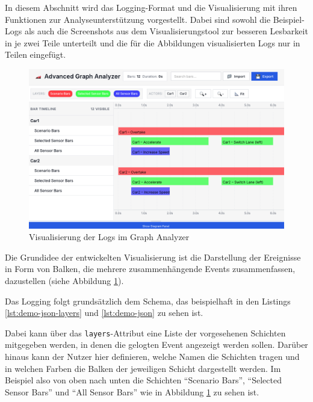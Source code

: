 In diesem Abschnitt wird das Logging-Format und die Visualisierung mit ihren Funktionen zur Analyseunterstützung vorgestellt. Dabei sind sowohl die Beispiel-Logs als auch die Screenshots aus dem Visualisierungstool zur besseren Lesbarkeit in je zwei Teile unterteilt und die für die Abbildungen visualisierten Logs nur in Teilen eingefügt.

\begin{figure}[htb]
    \centering
    \includegraphics[width=\textwidth]{contents/figures/graph_analyzer.png}
    \caption{Visualisierung der Logs im Graph Analyzer}
    \label{fig:analyzer_graph}
\end{figure}

Die Grundidee der entwickelten Visualisierung ist die Darstellung der Ereignisse in Form von Balken, die mehrere zusammenhängende Events zusammenfassen, dazustellen (siehe Abbildung \ref{fig:analyzer_graph}).



Das Logging folgt grundsätzlich dem Schema, das beispielhaft in den Listings \ref{lst:demo-json-layers} und \ref{lst:demo-json} zu sehen ist.

Dabei kann über das \texttt{layers}-Attribut eine Liste der vorgesehenen Schichten mitgegeben werden, in denen die gelogten Event angezeigt werden sollen. Darüber hinaus kann der Nutzer hier definieren, welche Namen die Schichten tragen und in welchen Farben die Balken der jeweiligen Schicht dargestellt werden. Im Beispiel also von oben nach unten die Schichten \enquote{Scenario Bars}, \enquote{Selected Sensor Bars} und \enquote{All Sensor Bars} wie in Abbildung \ref{fig:analyzer_graph} zu sehen ist.

